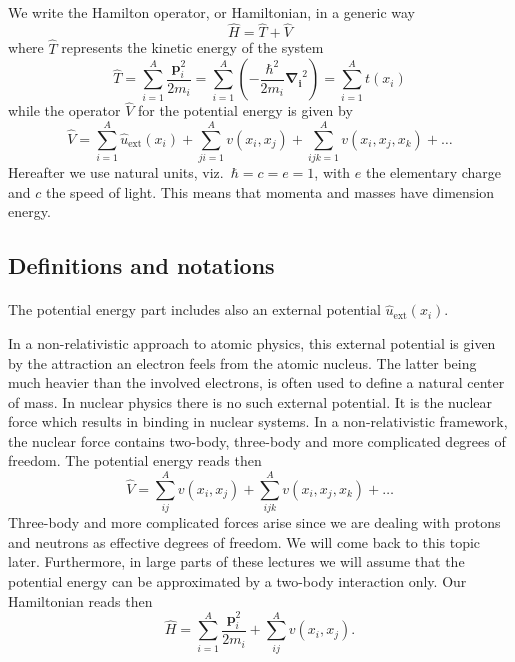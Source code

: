 \documentclass[%
twoside,                 %
final,                   %
10pt]{article}
\begin{document}
\paragraph{}
We write the Hamilton operator, or Hamiltonian,  in a generic way 
\[
	\hat{H} = \hat{T} + \hat{V} 
\]
where $\hat{T}$  represents the kinetic energy of the system
\[
	\hat{T} = \sum_{i=1}^A \frac{\mathbf{p}_i^2}{2m_i} = \sum_{i=1}^A \left( -\frac{\hbar^2}{2m_i} \mathbf{\nabla_i}^2 \right) =
		\sum_{i=1}^A t(x_i)
\]
while the operator $\hat{V}$ for the potential energy is given by
\begin{equation}
	\hat{V} = \sum_{i=1}^A \hat{u}_{\mathrm{ext}}(x_i) + \sum_{ji=1}^A v(x_i,x_j)+\sum_{ijk=1}^Av(x_i,x_j,x_k)+\dots
\label{eq:firstv}
\end{equation}
Hereafter we use natural units, viz.~$\hbar=c=e=1$, with $e$ the elementary charge and $c$ the speed of light. This means that momenta and masses
have dimension energy.





\subsection*{Definitions and notations}

\paragraph{}
The potential energy part includes also an external potential $\hat{u}_{\mathrm{ext}}(x_i)$.

In a non-relativistic approach to atomic  physics, this external potential is given by the attraction an electron feels from the atomic nucleus. The latter being much heavier than the involved electrons, is often used to define a natural center of mass. In nuclear physics there is no such external potential. It is the nuclear force which results in binding in nuclear systems. In a non-relativistic framework, the nuclear force contains two-body, three-body and more complicated degrees of freedom. The potential energy reads then  
\[
	\hat{V} = \sum_{ij}^A v(x_i,x_j)+\sum_{ijk}^Av(x_i,x_j,x_k)+\dots
\]
Three-body and more  complicated forces arise since we are dealing with protons and neutrons as effective degrees of freedom. We will come back to this topic later. Furthermore, in large parts of these lectures we will assume that the potential energy can be approximated by a two-body interaction only. Our Hamiltonian reads then
\begin{equation}
	\hat{H} = \sum_{i=1}^A \frac{\mathbf{p}_i^2}{2m_i}+\sum_{ij}^A v(x_i,x_j).
\label{eq:firstH}
\end{equation}
\end{document}
